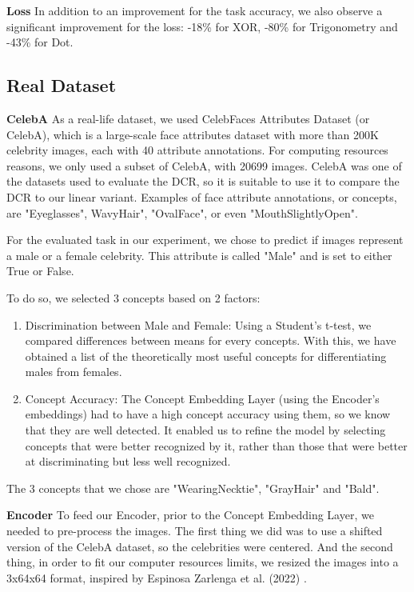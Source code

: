 \documentclass[sigconf, nonacm]{acmart}
\begin{document}
\textbf{Loss} In addition to an improvement for the task accuracy, we also observe a significant improvement for the loss: -18\% for XOR, -80\% for Trigonometry and -43\% for Dot.\vspace{8pt}

\subsection{Real Dataset}
\vspace{2pt}
\textbf{CelebA} As a real-life dataset, we used CelebFaces Attributes Dataset (or CelebA), which is a large-scale face attributes dataset with more than 200K celebrity images, each with 40 attribute annotations. For computing resources reasons, we only used a subset of CelebA, with 20699 images. CelebA was one of the datasets used to evaluate the DCR, so it is suitable to use it to compare the DCR to our linear variant. Examples of face attribute annotations, or concepts, are "Eyeglasses", Wavy\textunderscore Hair", "Oval\textunderscore Face", or even "Mouth\textunderscore Slightly\textunderscore Open".

For the evaluated task in our experiment, we chose to predict if images represent a male or a female celebrity. This attribute is called "Male" and is set to either True or False.

To do so, we selected 3 concepts based on 2 factors: \vspace{4pt}
\begin{enumerate}
    \item Discrimination between Male and Female: Using a Student's t-test, we compared differences between means for every concepts. With this, we have obtained a list of the theoretically most useful concepts for differentiating males from females.\vspace{8pt}
    \item Concept Accuracy: The Concept Embedding Layer (using the Encoder's embeddings) had to have a high concept accuracy using them, so we know that they are well detected. It enabled us to refine the model by selecting concepts that were better recognized by it, rather than those that were better at discriminating but less well recognized.
\end{enumerate}
The 3 concepts that we chose are "Wearing\textunderscore Necktie", "Gray\textunderscore Hair" and "Bald". \vspace{8pt}

\textbf{Encoder} To feed our Encoder, prior to the Concept Embedding Layer, we needed to pre-process the images. The first thing we did was to use a shifted version of the CelebA dataset, so the celebrities were centered. And the second thing, in order to fit our computer resources limits, we resized the images into a 3x64x64 format, inspired by Espinosa Zarlenga et al. (2022) \cite{espinosa2022concept}.
\end{document}
